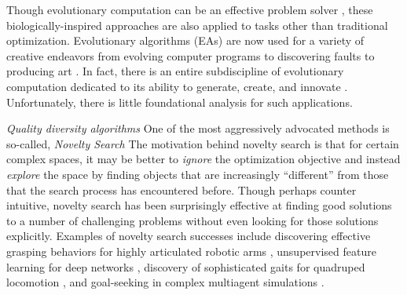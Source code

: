 \documentclass[twoside]{article}
\begin{document}
Though evolutionary computation can be an effective problem solver \citep{ec:DeJong2006,ec:Mitchell97,ec:Michalawicz96,ec:Goldberg89,ec:Holland75}, these biologically-inspired approaches are also applied to tasks other than traditional optimization.  Evolutionary algorithms (EAs) are now used for a variety of creative endeavors from evolving computer programs \citep{ec:LangdonPoli2002,ec:Banzhaf1998,ec:Koza1992} 
 to discovering faults \citep{HanesWiegand2019tor,Mourad2000srds} to producing art \citep{cs:Dreher2014,Secretan2008chi,ec:Romero2007,bio:Dawkins1996}.  In fact, there is an entire subdiscipline of evolutionary computation dedicated to its ability to generate, create, and innovate \citep{ec:Goldberg2002}.  Unfortunately, there is little foundational analysis for such applications.

\emph{Quality diversity algorithms}  One of the most aggressively advocated methods is so-called, \emph{Novelty Search} \citep{StanleyLehman2015,Lehman2013gecco,LehmanStanley2011cec,LehmanStanley2008ssls}  The motivation behind novelty search is that for certain complex spaces, it may be better to \emph{ignore} the optimization objective and instead \emph{explore} the space by finding objects that are increasingly ``different'' from those that the search process has encountered before.  Though perhaps counter intuitive, novelty search has been surprisingly effective at finding good solutions to a number of challenging problems without even looking for those solutions explicitly.  Examples of novelty search successes include discovering effective grasping behaviors for highly articulated robotic arms \citep{Huang2014cica}, unsupervised feature learning for deep networks \citep{Szerlip2015cai}, discovery of sophisticated gaits for quadruped locomotion \citep{Morse2013acgec}, and goal-seeking in complex multiagent simulations \citep{Lehman2011ecj}.
\end{document}
